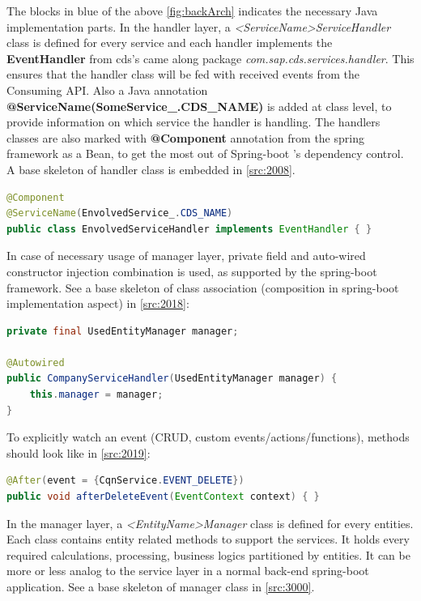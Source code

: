 The blocks in blue of the above \autoref{fig:backArch} indicates the necessary Java implementation parts. 
In the handler layer, a \textit{<ServiceName>ServiceHandler} class is defined for every service and each handler implements the \textbf{EventHandler} \cite{cap-java-event-handler} from cds's came along package \textit{com.sap.cds.services.handler}. This ensures that the handler class will be fed with received events from the Consuming API. Also a Java annotation \textbf{@ServiceName(SomeService\_.CDS\_NAME)} is added at class level, to provide information on which service the handler is handling. The handlers classes are also marked with \textbf{@Component} annotation from the spring framework as a Bean, to get the most out of Spring-boot \cite{springboot-doc}'s dependency control. A base skeleton of handler class is embedded in \autoref{src:2008}.

\begin{lstlisting}[language={java}]
@Component
@ServiceName(EnvolvedService_.CDS_NAME)
public class EnvolvedServiceHandler implements EventHandler { }
\end{lstlisting}

In case of necessary usage of manager layer, private field and auto-wired constructor injection combination is used, as supported by the spring-boot framework. See a base skeleton of class association (composition in spring-boot implementation aspect) in \autoref{src:2018}:

\begin{lstlisting}[language={java}]
private final UsedEntityManager manager;

@Autowired
public CompanyServiceHandler(UsedEntityManager manager) {
    this.manager = manager;
}
\end{lstlisting}

To explicitly watch an event (CRUD, custom events/actions/functions), methods should look like in \autoref{src:2019}:
\begin{lstlisting}[language={java}]
@After(event = {CqnService.EVENT_DELETE})
public void afterDeleteEvent(EventContext context) { }
\end{lstlisting}

\bigskip
In the manager layer, a \textit{<EntityName>Manager} class is defined for every entities. Each class contains entity related methods to support the services. It holds every required calculations, processing, business logics partitioned by entities. It can be more or less analog to the service layer in a normal back-end spring-boot application.
See a base skeleton of manager class in \autoref{src:3000}.


